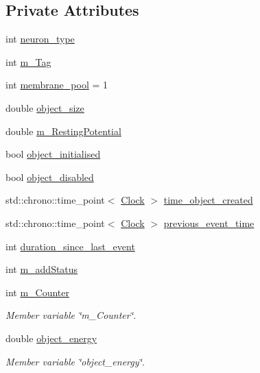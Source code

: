 \subsection*{Private Attributes}
\begin{DoxyCompactItemize}
\item 
int \mbox{\hyperlink{classNeuron_a182d8061d0beac5ede8b5ea9ac21a1c9}{neuron\+\_\+type}}
\item 
int \mbox{\hyperlink{classNeuron_a8d900856e69534603cd984fef05811be}{m\+\_\+\+Tag}}
\item 
int \mbox{\hyperlink{classNeuron_abf8b1f840cd466fb23f2e778edef0a92}{membrane\+\_\+pool}} = 1
\item 
double \mbox{\hyperlink{classNeuron_ada166022e3abc5a5e32db25343f8f765}{object\+\_\+size}}
\item 
double \mbox{\hyperlink{classNeuron_a225fc0b7f0586a11fb62fee76f3f1acb}{m\+\_\+\+Resting\+Potential}}
\item 
bool \mbox{\hyperlink{classNeuron_ad936ed27ba3b0f5d8fe18d1dd2fd5fcf}{object\+\_\+initialised}}
\item 
bool \mbox{\hyperlink{classNeuron_a09ea127c2427653e15bfce989c717b3f}{object\+\_\+disabled}}
\item 
std\+::chrono\+::time\+\_\+point$<$ \mbox{\hyperlink{universe_8h_a0ef8d951d1ca5ab3cfaf7ab4c7a6fd80}{Clock}} $>$ \mbox{\hyperlink{classNeuron_aac5b1f8a26738f915778ebf25183f258}{time\+\_\+object\+\_\+created}}
\item 
std\+::chrono\+::time\+\_\+point$<$ \mbox{\hyperlink{universe_8h_a0ef8d951d1ca5ab3cfaf7ab4c7a6fd80}{Clock}} $>$ \mbox{\hyperlink{classNeuron_ab66c0975e682e5339cabc50981732ae5}{previous\+\_\+event\+\_\+time}}
\item 
int \mbox{\hyperlink{classNeuron_ab3cea312e56a8b3bb4707a1c2654fc36}{duration\+\_\+since\+\_\+last\+\_\+event}}
\item 
int \mbox{\hyperlink{classNeuron_a82f1de3ea8317c97f4968a06d13ec8ca}{m\+\_\+add\+Status}}
\item 
int \mbox{\hyperlink{classNeuron_ad6955bbce8c9b6c6ccde10c8022d9a07}{m\+\_\+\+Counter}}
\begin{DoxyCompactList}\small\item\em Member variable \char`\"{}m\+\_\+\+Counter\char`\"{}. \end{DoxyCompactList}\item 
double \mbox{\hyperlink{classNeuron_a2dba550b29497723039a3aa193934ab2}{object\+\_\+energy}}
\begin{DoxyCompactList}\small\item\em Member variable \char`\"{}object\+\_\+energy\char`\"{}. \end{DoxyCompactList}\item 

\end{DoxyCompactItemize}
